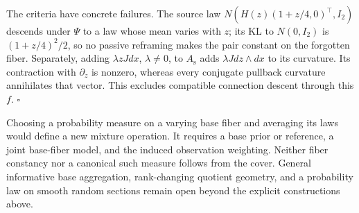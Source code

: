 The criteria have concrete failures. The source law
\(N(H(z)(1+z/4,0)^\top,I_2)\) descends under \(\Psi\) to a law
whose mean varies with \(z\); its KL to \(N(0,I_2)\) is
\((1+z/4)^2/2\), so no passive reframing makes the pair constant on the
forgotten fiber. Separately, adding \(\lambda zJ dx\),
\(\lambda\ne0\), to \(A_{\mathrm s}\) adds
\(\lambda J dz\wedge dx\) to its curvature. Its contraction with
\(\partial_z\) is nonzero, whereas every conjugate pullback curvature
annihilates that vector. This excludes compatible connection descent through
this \(f\). \(\square\)

Choosing a probability measure on a varying base fiber and averaging its laws
would define a new mixture operation. It requires a base prior or reference,
a joint base-fiber model, and the induced observation weighting. Neither
fiber constancy nor a canonical such measure follows from the cover. General
informative base aggregation, rank-changing quotient geometry, and a
probability law on smooth random sections remain open beyond the explicit
constructions above. 

